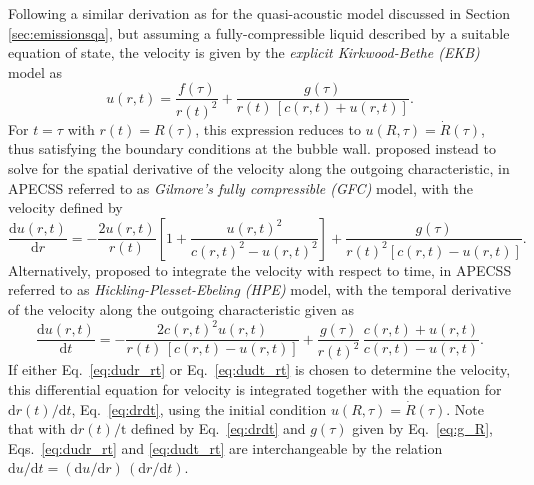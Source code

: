 Following a similar derivation as for the quasi-acoustic model discussed in Section \ref{sec:emissionsqa}, but assuming a fully-compressible liquid described by a suitable equation of state, the velocity is given by the {\it explicit Kirkwood-Bethe (EKB)} model as
\begin{equation}
    u(r,t) = \frac{f(\tau)}{r(t)^2} + \frac{g(\tau)}{r(t) \, [c(r,t) + u(r,t)]} . \label{eq:u_rt}
\end{equation}
For $t=\tau$ with $r(t)=R(\tau)$, this expression reduces to $u(R,\tau)=\dot{R}(\tau)$, thus satisfying the boundary conditions at the bubble wall.
\citet{Gilmore1952} proposed instead to solve for the spatial derivative of the velocity along the outgoing characteristic, in APECSS referred to as {\it Gilmore's fully compressible (GFC)} model, with the velocity defined by 
\begin{equation}
    \frac{\mathrm{d}u(r,t)}{\mathrm{d}r} = - \frac{2 u(r,t)}{r(t)} \left[1+\frac{u(r,t)^2}{c(r,t)^2-u(r,t)^2} \right] + \frac{g(\tau)}{r(t)^2 [c(r,t)-u(r,t)]} \label{eq:dudr_rt}.
\end{equation}
Alternatively, \citet{Hickling1963} proposed to integrate the velocity with respect to time, in APECSS referred to as {\it Hickling-Plesset-Ebeling (HPE)} model, with the temporal derivative of the velocity along the outgoing characteristic given as
\begin{equation}
    \frac{\mathrm{d}u(r,t)}{\mathrm{d}t} =  - \frac{2 c(r,t)^2 u(r,t)}{r(t) \, [c(r,t)-u(r,t)]} + \frac{g(\tau)}{r(t)^2} \, \frac{c(r,t)+u(r,t)}{c(r,t)-u(r,t)}. \label{eq:dudt_rt}
\end{equation}
If either Eq.~\eqref{eq:dudr_rt} or Eq.~\eqref{eq:dudt_rt} is chosen to determine the velocity, this differential equation for velocity is integrated together with the equation for ${\mathrm{d}r(t)/\mathrm{d}t}$, Eq.~\eqref{eq:drdt}, using the initial condition $u(R,\tau) = \dot{R}(\tau)$. Note that with $\mathrm{d}r(t)/\mathrm{t}$ defined by Eq.~\eqref{eq:drdt} and $g(\tau)$ given by Eq.~\eqref{eq:g_R}, Eqs.~\eqref{eq:dudr_rt} and \eqref{eq:dudt_rt} are interchangeable by the relation ${\mathrm{d}u/\mathrm{d}t} = ({\mathrm{d}u/\mathrm{d}r}) \, ({\mathrm{d}r/\mathrm{d}t})$. 

